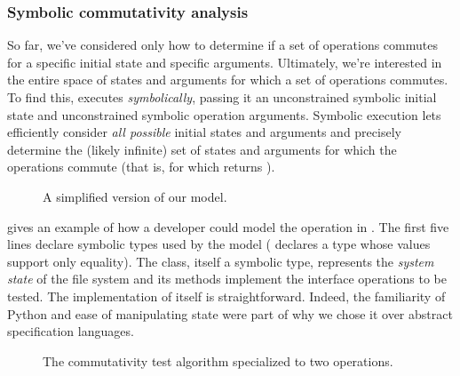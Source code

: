 \subsubsection{Symbolic commutativity analysis}
\label{sec:topic:rename-conditions}

So far, we've considered only how to determine if a set of operations
commutes for a specific initial state and specific arguments.
Ultimately, we're interested in the entire space of states and
arguments for which a set of operations commutes.  To find this,
\analyzer executes  \emph{symbolically}, passing it an
unconstrained symbolic initial state and unconstrained symbolic
operation arguments.  Symbolic execution lets \analyzer efficiently
consider \emph{all possible} initial states and arguments and
precisely determine the (likely infinite) set of states and arguments
for which the operations commute (that is, for which 
returns ).

\begin{figure}
  \caption{A simplified version of our  model.}
  \label{fig:rename-spec}
\end{figure}

 gives an example of how a developer could model
the  operation in \analyzer.  The first five lines
declare symbolic types used by the model (
declares a type whose values support only equality).  The 
class, itself a symbolic type, represents the \emph{system state} of
the file system and its methods implement the interface operations to
be tested.  The implementation of  itself is
straightforward.  Indeed, the familiarity of Python and ease of
manipulating state were part of why we chose it over abstract
specification languages.

\begin{figure}
  \caption{The \SIM commutativity test algorithm specialized to two
    operations.}
  \label{fig:commutes2}
\end{figure}

